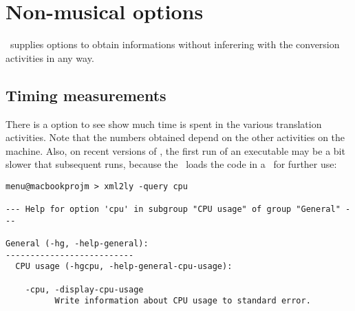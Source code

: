 



\chapter{Non-musical options}

\mf\ supplies options to obtain informations without inferering with the conversion activities in any way.


\section{Timing measurements}

There is a  option to see show much time is spent in the various translation activities. Note that the numbers obtained depend on the other activities on the machine. Also, on recent versions of \MacOS, the first run of an executable may be a bit slower that subsequent runs, because the \OS\ loads the code in a \cache\ for further use:
\begin{lstlisting}[language=MusicXML]
menu@macbookprojm > xml2ly -query cpu

--- Help for option 'cpu' in subgroup "CPU usage" of group "General" ---

General (-hg, -help-general):
--------------------------
  CPU usage (-hgcpu, -help-general-cpu-usage):

    -cpu, -display-cpu-usage
          Write information about CPU usage to standard error.
\end{lstlisting}

